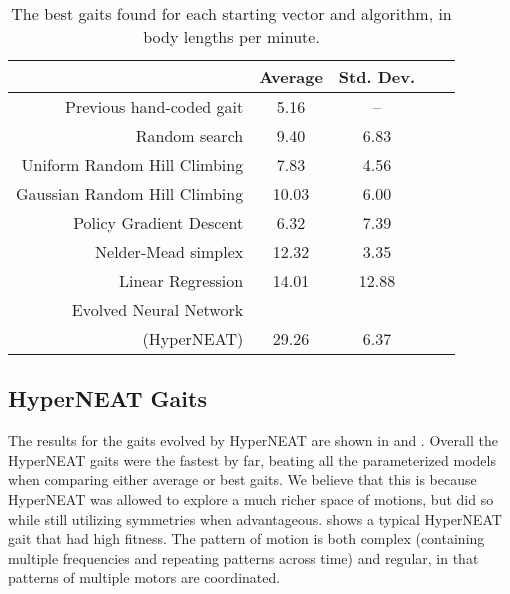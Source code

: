 \begin{table}
\begin{center}
\begin{tabular}{|r|c|c|c||c|}
\hline
                                         & Average & Std. Dev. \\
\hline                                    
\hline                                    
Previous hand-coded gait                 & 5.16   &   --     \\
\hline
Random search                            & 9.40   &   6.83   \\
\hline
Uniform Random Hill Climbing             & 7.83   &   4.56   \\
\hline
Gaussian Random Hill Climbing            & 10.03  &   6.00   \\
\hline
Policy Gradient Descent                  & 6.32   &   7.39   \\
\hline
Nelder-Mead simplex                      & 12.32  &   3.35   \\
\hline
Linear Regression                        & 14.01  &  12.88   \\
\hline
Evolved Neural Network              &        &          \\
(HyperNEAT)                              & 29.26  &   6.37   \\
\hline
\end{tabular}
\caption{The best gaits found for each starting vector and algorithm,
  in body lengths per minute.}
\end{center}
\end{table}







\subsection{HyperNEAT Gaits}

The results for the gaits evolved by HyperNEAT are shown
in  and .  Overall the HyperNEAT gaits
were the fastest by far, beating all the parameterized models when
comparing either average or best gaits.  We believe
that this is because HyperNEAT was allowed to explore a
much richer space of motions, but did so while still utilizing
symmetries when advantageous.
 shows a typical
HyperNEAT gait that had high fitness.  The pattern of motion is both
complex (containing multiple frequencies and repeating patterns across time)
and regular, in that patterns of multiple motors are coordinated. 

